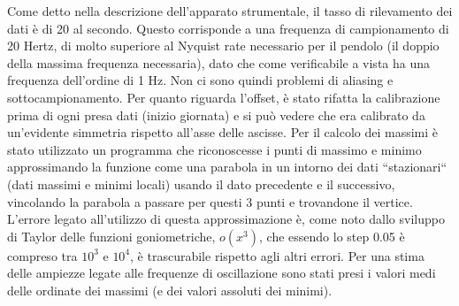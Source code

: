 Come detto nella descrizione dell'apparato strumentale, il tasso di rilevamento dei dati è di 20 al secondo. Questo corrisponde a una
frequenza di campionamento di 20 Hertz, di molto superiore al 
Nyquist rate necessario per il pendolo (il doppio della massima frequenza
necessaria), dato che come verificabile a vista ha una frequenza dell'ordine di 1 Hz. 
Non ci sono quindi problemi di aliasing e sottocampionamento.
Per quanto riguarda l'offset, è stato rifatta la calibrazione prima di ogni presa dati (inizio giornata) e si può vedere che era
 calibrato da un'evidente simmetria rispetto all'asse delle ascisse.
Per il calcolo dei massimi è stato utilizzato un programma che riconoscesse i punti di massimo e minimo approssimando
la funzione come una parabola in un intorno dei dati ``stazionari`` (dati massimi e minimi locali) usando il dato precedente e il successivo,
vincolando la parabola a passare per questi 3 punti e trovandone il vertice. L'errore legato all'utilizzo
 di questa approssimazione è, come noto dallo sviluppo di Taylor delle funzioni goniometriche, $o(x^3)$, che essendo lo step 0.05 è compreso tra $10^3$ e $10^4$, è trascurabile rispetto agli altri errori.
 Per una stima delle ampiezze legate alle frequenze di oscillazione sono stati presi i valori medi delle ordinate dei massimi (e dei valori assoluti dei minimi).

